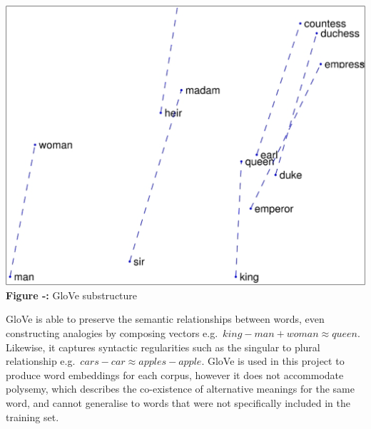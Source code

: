 \documentclass[12pt,a4paper]{article}
\begin{document}
\begin{minipage}{0.3\textwidth}
	\vspace{-10pt}
	\begin{center}
		\hspace{-1cm}\includegraphics[width=1.05\textwidth]{Images/outside1.png}\\
		\hspace{-1cm}\textbf{Figure -:} GloVe substructure\footnotemark[5]\\
		\label{Glove Model}
	\end{center}
\end{minipage} \hfill
\begin{minipage}{0.66\textwidth}
	 GloVe is able to preserve the semantic relationships between words, even constructing analogies by composing vectors e.g.\ $king - man + woman ≈ queen$. Likewise, it captures syntactic regularities such as the singular to plural relationship e.g.\ $cars - car ≈ apples - apple$. GloVe is used in this project to produce word embeddings for each corpus, however it does not accommodate polysemy, which describes the co-existence of alternative meanings for the same word, and cannot generalise to words that were not specifically included in the training set.\\
\end{minipage}\\
\end{document}
